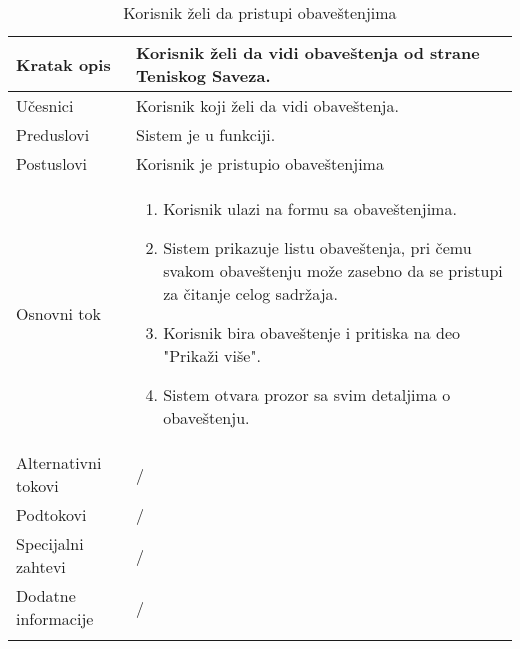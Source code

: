 \documentclass{article}
\begin{document}
        \begin{longtable}{| p{} | p{} |} 
            \hline
                Kratak opis & Korisnik želi da vidi obaveštenja od strane Teniskog Saveza.\\ 
            \hline    
                Učesnici & Korisnik koji želi da vidi obaveštenja. \\
            \hline
               Preduslovi &  Sistem je u funkciji.\\
            \hline  
                Postuslovi &  Korisnik je pristupio obaveštenjima\\
            \hline
                Osnovni tok & \begin{enumerate}
                    \item Korisnik ulazi na formu sa obaveštenjima.
                    \item Sistem prikazuje listu obaveštenja, pri čemu svakom obaveštenju može zasebno da se pristupi za čitanje celog sadržaja.
                    \item Korisnik bira obaveštenje i pritiska na deo "Prikaži više".
                    \item Sistem otvara prozor sa svim detaljima o obaveštenju.
                \end{enumerate}\\
            \hline
                Alternativni tokovi & /\\
            \hline
                Podtokovi & /\\
            \hline
                Specijalni zahtevi & /\\
            \hline
                Dodatne informacije & /\\
            \hline
            \caption{Korisnik želi da pristupi obaveštenjima} 
        \end{longtable}
\end{document}
